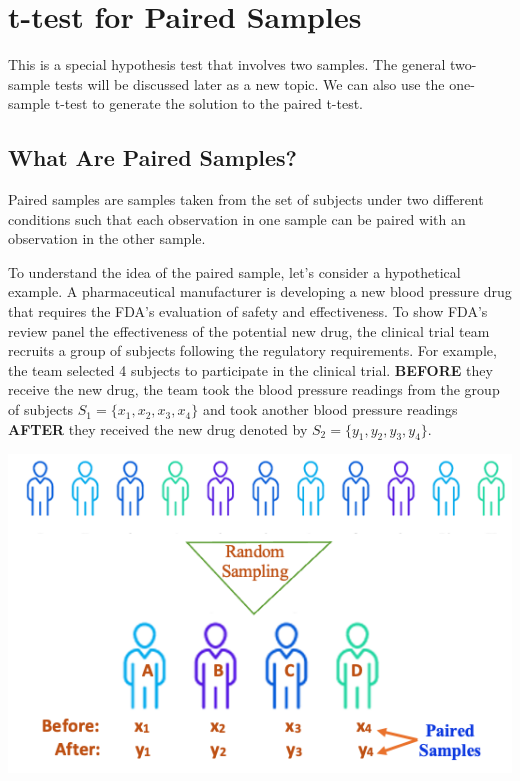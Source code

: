 \documentclass[
]{book}
\begin{document}
\hfill\break

\hypertarget{t-test-for-paired-samples}{%
\section{t-test for Paired Samples}\label{t-test-for-paired-samples}}

This is a special hypothesis test that involves two samples. The general two-sample tests will be discussed later as a new topic. We can also use the one-sample t-test to generate the solution to the paired t-test.

\hfill\break

\hypertarget{what-are-paired-samples}{%
\subsection{What Are Paired Samples?}\label{what-are-paired-samples}}

Paired samples are samples taken from the set of subjects under two different conditions such that each observation in one sample can be paired with an observation in the other sample.

To understand the idea of the paired sample, let's consider a hypothetical example. A pharmaceutical manufacturer is developing a new blood pressure drug that requires the FDA's evaluation of safety and effectiveness. To show FDA's review panel the effectiveness of the potential new drug, the clinical trial team recruits a group of subjects following the regulatory requirements. For example, the team selected 4 subjects to participate in the clinical trial. \textbf{BEFORE} they receive the new drug, the team took the blood pressure readings from the group of subjects \(S_1 = \{x_1, x_2, x_3, x_4 \}\) and took another blood pressure readings \textbf{AFTER} they received the new drug denoted by \(S_2 = \{y_1, y_2, y_3, y_4 \}\).

\begin{center}\includegraphics[width=0.5\linewidth]{week10/pairedSample} \end{center}
\end{document}
